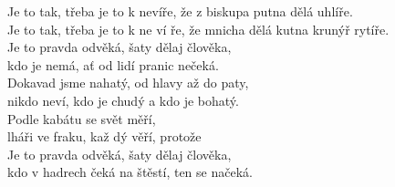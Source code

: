  
\nv{}Je to tak, třeba je to k nevíře, že z biskupa putna dělá uhlíře.\\
Je \sm {}\sm to \nc {}tak, třeba je to k ne ví \sm{}ře, \sm{} že mnicha dělá kutna krunýř rytíře.
\vnv\\
\nv{}Je to pravda  odvěká, šaty dělaj člověka,\\
kdo je nemá, ať od lidí pranic nečeká.\\
Dokavad jsme nahatý, od hlavy až do paty,\\
nikdo neví, kdo je chudý a kdo je bohatý.
\vnv\\
\nv{}Podle kabátu se \sm{}svět měří, \mm{}\\
lháři ve \sm fra\sm{}ku, kaž dý věří, protože\\
Je to pravda  odvěká, šaty dělaj člověka,\\
kdo v hadrech čeká na štěstí, \sm {}ten se načeká.

\newpage

